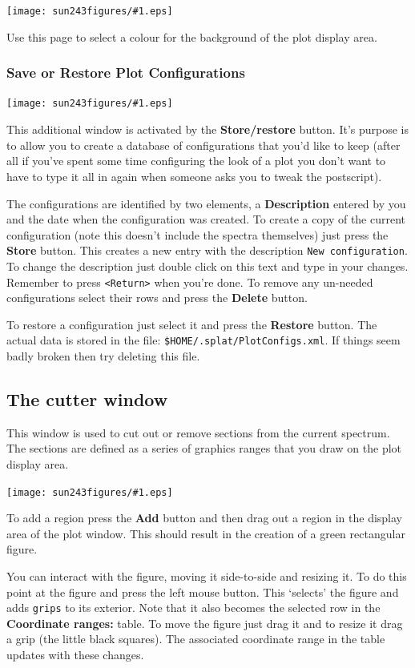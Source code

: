 \documentclass[twoside,11pt]{article}
\newcommand{\htmladdimg}[1]{}
\newcommand{\latexhtml}[2]{#1}
\renewcommand{\_}{\texttt{\symbol{95}}}
\newcommand{\mainfigure}[1]
{\begin{center}
 \latexhtml{\texttt{[image: sun243\_figures/\#1.eps]}}{\htmladdimg{#1.gif}}
 \end{center}
}
\newcommand{\labelitem}[1]{\textbf{#1}}
\newcommand{\hitext}[1]{\texttt{#1}}
\begin{document}
\mainfigure{configurewindowbackground}

Use this page to select a colour for the background of the plot
display area.

\newpage
\subsubsection*{Save or Restore Plot Configurations}

\mainfigure{restorewindow}

This additional window is activated by the \labelitem{Store/restore}
button. It's purpose is to allow you to create a database of configurations
that you'd like to keep (after all if you've spent some time configuring the
look of a plot you don't want to have to type it all in again when someone
asks you to tweak the postscript).

The configurations are identified by two elements, a
\labelitem{Description} entered by you and the date when the
configuration was created. To create a copy of the current configuration
(note this doesn't include the spectra themselves) just press the
\labelitem{Store} button. This creates a new entry with the description
\hitext{New configuration}. To change the description just double
click on this text and type in your changes. Remember to press
\hitext{<Return>} when you're done. To remove any un-needed
configurations select their rows and press the \labelitem{Delete}
button.

To restore a configuration just select it and press the
\labelitem{Restore} button. The actual data is stored in the file:
\hitext{\$HOME/.splat/PlotConfigs.xml}. If things seem badly broken
then try deleting this file.

\newpage
\subsection{The cutter window}

This window is used to cut out or remove sections from the current
spectrum. The sections are defined as a series of graphics ranges that
you draw on the plot display area.

\mainfigure{cutterwindow}

To add a region press the \labelitem{Add} button and then drag out a
region in the display area of the plot window. This should result in
the creation of a green rectangular figure.

You can interact with the figure, moving it side-to-side and resizing
it. To do this point at the figure and press the left mouse
button. This `selects' the figure and adds \hitext{grips} to its
exterior. Note that it also becomes the selected row in the
\labelitem{Coordinate ranges:} table. To move the figure just drag it
and to resize it drag a grip (the little black squares). The
associated coordinate range in the table updates with these changes.
\end{document}

